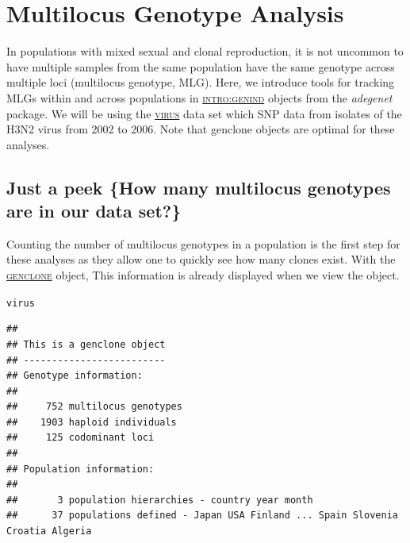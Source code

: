 \documentclass[letterpaper]{article}\usepackage[]{graphicx}\usepackage[]{color}
\makeatletter
\newcommand{\hlstd}[1]{\textcolor[rgb]{0,0,0}{#1}}%
\newenvironment{kframe}{%
 \def\at@end@of@kframe{}%
 \ifinner\ifhmode%
  \def\at@end@of@kframe{\end{minipage}}%
  \begin{minipage}{\columnwidth}%
 \fi\fi%
 \def\FrameCommand##1{\hskip\@totalleftmargin \hskip-\fboxsep
 \colorbox{shadecolor}{##1}\hskip-\fboxsep
     \hskip-\linewidth \hskip-\@totalleftmargin \hskip\columnwidth}%
 \MakeFramed {\advance\hsize-\width
   \@totalleftmargin\z@ \linewidth\hsize
   \@setminipage}}%
 {\par\unskip\endMakeFramed%
 \at@end@of@kframe}
\newenvironment{knitrout}{}{} %
\newcommand{\tab}{\hspace*{1em}}
\newcommand{\seclink}[2]{
  \textsc{\hyperref[#1]{#2}}
}
\newcommand{\adegenet}{\textit{adegenet}}
\makeatother
\begin{document}
\section{Multilocus Genotype Analysis}
\label{mlg}

\tab\tab In populations with mixed sexual and clonal reproduction, it is not uncommon to have multiple samples from the same population have the same genotype across multiple loci (multilocus genotype, MLG). Here, we introduce tools for tracking MLGs within and across populations in\seclink{genind}{intro:genind}objects from the \adegenet{} package. We will be using the\seclink{data:virus}{virus}data set which SNP data from isolates of the H3N2 virus from 2002 to 2006. Note that genclone objects are optimal for these analyses.
%
\subsection{Just a peek \{How many multilocus genotypes are in our data set?\}}
\label{mlg:mlg}
\tab\tab Counting the number of multilocus genotypes in a population is the first step for these analyses as they allow one to quickly see how many clones
exist. With the\seclink{intro:genclone}{genclone}object, This information is
already displayed when we view the object.
\begin{knitrout}\footnotesize
{}\color{fgcolor}\begin{kframe}
\begin{alltt}
\hlstd{virus}
\end{alltt}
\begin{verbatim}
## 
## This is a genclone object
## -------------------------
## Genotype information:
## 
##     752 multilocus genotypes
##    1903 haploid individuals
##     125 codominant loci
## 
## Population information:
## 
##       3 population hierarchies - country year month
##      37 populations defined - Japan USA Finland ... Spain Slovenia Croatia Algeria
\end{verbatim}
\end{kframe}
\end{knitrout}
\end{document}
